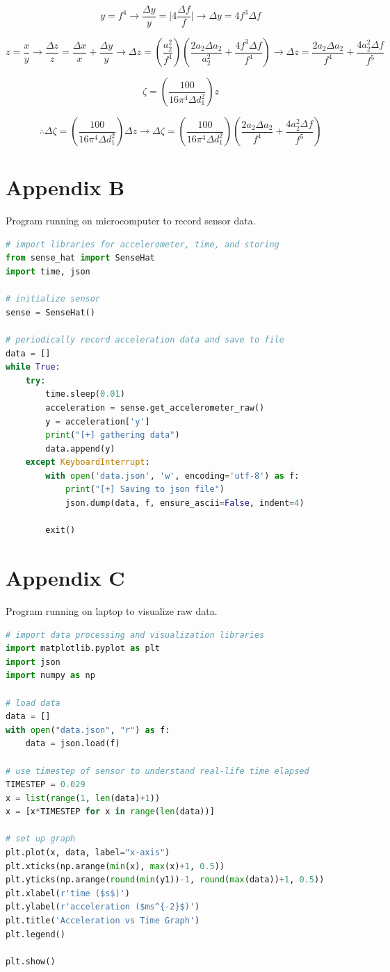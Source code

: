 \documentclass[11pt]{article}
\begin{document}
$$y=f^4 \rightarrow \frac{\Delta y}{y}=\mid 4\frac{\Delta f}{f} \mid \rightarrow \Delta y = 4f^3\Delta f$$

$$z = \frac{x}{y} \rightarrow \frac{\Delta z}{z}=\frac{\Delta x}{x} + \frac{\Delta y}{y} \rightarrow \Delta z = (\frac{a^2_2}{f^4})(\frac{2a_2\Delta a_2}{a_2^2} + \frac{4f^3\Delta f}{f^4}) \rightarrow \Delta z = \frac{2a_2\Delta a_2}{f^4} + \frac{4a^2_2 \Delta f}{f^5}$$

$$\zeta = (\frac{100}{16\pi^4\Delta d_1^2})z$$

$$\therefore \Delta \zeta = (\frac{100}{16\pi^4\Delta d_1^2})\Delta z \rightarrow \Delta \zeta = (\frac{100}{16\pi^4\Delta d_1^2})(\frac{2a_2\Delta a_2}{f^4} + \frac{4a^2_2 \Delta f}{f^5})$$


\newpage
\section{Appendix B}
Program running on microcomputer to record sensor data.
\begin{lstlisting}[language=Python]
# import libraries for accelerometer, time, and storing
from sense_hat import SenseHat
import time, json

# initialize sensor
sense = SenseHat()

# periodically record acceleration data and save to file
data = []
while True:
    try:
        time.sleep(0.01)
        acceleration = sense.get_accelerometer_raw()
        y = acceleration['y']
        print("[+] gathering data")
        data.append(y)
    except KeyboardInterrupt:
        with open('data.json', 'w', encoding='utf-8') as f:
            print("[+] Saving to json file")
            json.dump(data, f, ensure_ascii=False, indent=4)

        exit()
\end{lstlisting}

\newpage
\section{Appendix C}
Program running on laptop to visualize raw data.
\begin{lstlisting}[language=Python]
# import data processing and visualization libraries
import matplotlib.pyplot as plt
import json
import numpy as np

# load data
data = []
with open("data.json", "r") as f:
    data = json.load(f)

# use timestep of sensor to understand real-life time elapsed
TIMESTEP = 0.029
x = list(range(1, len(data)+1))
x = [x*TIMESTEP for x in range(len(data))]

# set up graph
plt.plot(x, data, label="x-axis")
plt.xticks(np.arange(min(x), max(x)+1, 0.5))
plt.yticks(np.arange(round(min(y1))-1, round(max(data))+1, 0.5))
plt.xlabel(r'time ($s$)')
plt.ylabel(r'acceleration ($ms^{-2}$)')
plt.title('Acceleration vs Time Graph')
plt.legend()

plt.show()

\end{lstlisting}
\end{document}
